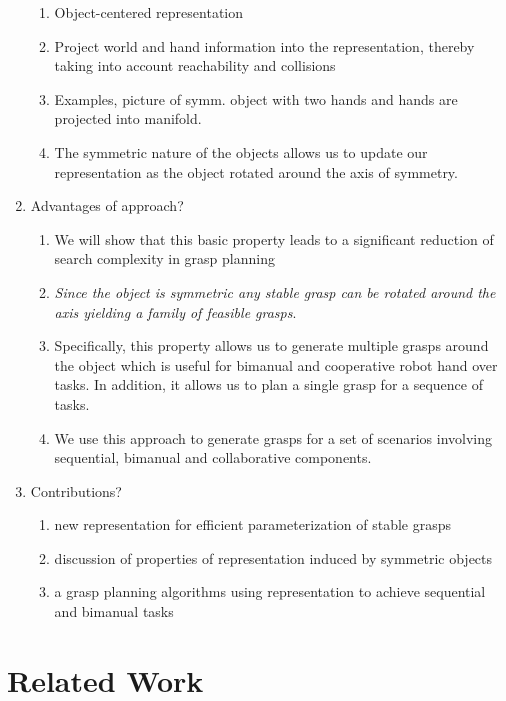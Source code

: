 \documentclass{aamas2015}
\begin{document}
\begin{enumerate}
\begin{enumerate}
	\item Object-centered representation
	\item Project world and hand information into the representation, thereby taking
		  into account reachability and collisions
	\item Examples, picture of symm. object with two hands and hands are projected 
		  into manifold.
	\item The symmetric nature of the objects allows us to update our representation
		  as the object rotated around the axis of symmetry.
\end{enumerate}
\item Advantages of approach?
	\begin{enumerate}
	\item We will show that this basic property leads to a significant reduction of 
		  search complexity in grasp planning
	\item \emph{Since the object is symmetric any stable grasp can be rotated around the axis
		  yielding a family of feasible grasps}.
	\item Specifically, this property allows us to generate multiple grasps around 
		  the object which is useful for bimanual and cooperative robot hand over 
		  tasks. In addition, it allows us to plan a single grasp for a sequence of tasks.
	\item We use this approach to generate grasps for a set of scenarios involving
		  sequential, bimanual and collaborative components. 
	\end{enumerate}
	
\item Contributions?
	\begin{enumerate}
	\item new representation for efficient parameterization of stable grasps 	
	\item discussion of properties of representation induced by symmetric objects
	\item a grasp planning algorithms using representation to achieve sequential and 
		  bimanual tasks  
	\end{enumerate}
	\end{enumerate}
	
\section{Related Work}
\end{document}
